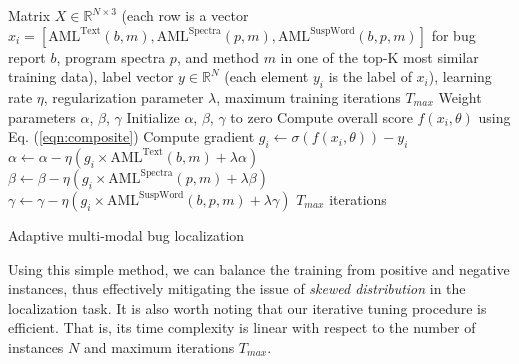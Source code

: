 \begin{algorithm}[!t]
\begin{algorithmic}[1]
\Require Matrix $X \in \mathbb{R}^{N \times 3}$ (each row is a vector $x_i = [\text{AML}^{\text{Text}}(b,m), \text{AML}^{\text{Spectra}}(p,m), \text{AML}^{\text{SuspWord}}(b,p,m)]$ for bug report $b$, program spectra $p$, and method $m$ in one of the top-K most similar training data), label vector $y \in \mathbb{R}^{N}$ (each element $y_i$ is the label of $x_i$), learning rate $\eta$, regularization parameter $\lambda$, maximum training iterations $T_{max}$
\Ensure Weight parameters $\alpha$, $\beta$, $\gamma$
\State Initialize $\alpha$, $\beta$, $\gamma$ to zero
\Repeat
		  
		\Else {}
		\EndIf
		\State Compute overall score $f(x_i, \theta)$ using Eq. (\ref{eqn:composite})
		\State Compute gradient $g_i \leftarrow \sigma(f(x_i, \theta)) - y_i$
		\State $\alpha \leftarrow \alpha - \eta \left( g_i \times \text{AML}^{\text{Text}}(b,m) + \lambda \alpha \right) $
		\State $\beta \leftarrow \beta - \eta \left( g_i \times \text{AML}^{\text{Spectra}}(p,m) + \lambda \beta \right)$
		\State  $\gamma \leftarrow \gamma - \eta \left( g_i \times \text{AML}^{\text{SuspWord}}(b,p,m) + \lambda \gamma \right)$
	\EndFor
\Until $T_{max}$ iterations
\end{algorithmic}
\caption{Adaptive multi-modal bug localization}
\label{alg:adaptive}
\end{algorithm}

Using this simple method, we can balance the training from positive and negative instances, thus effectively mitigating the issue of {\em skewed distribution} in the localization task. It is also worth noting that our iterative tuning procedure is efficient. That is, its time complexity is linear with respect to the number of instances $N$ and maximum iterations $T_{max}$. %